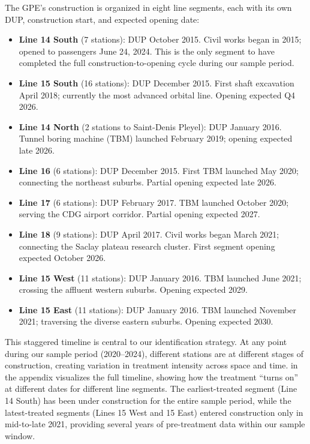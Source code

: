 \documentclass[12pt]{article}
\begin{document}
The GPE's construction is organized in eight line segments, each with its own DUP, construction start, and expected opening date:

\begin{itemize}
\item \textbf{Line 14 South} (7 stations): DUP October 2015. Civil works began in 2015; opened to passengers June 24, 2024. This is the only segment to have completed the full construction-to-opening cycle during our sample period.
\item \textbf{Line 15 South} (16 stations): DUP December 2015. First shaft excavation April 2018; currently the most advanced orbital line. Opening expected Q4 2026.
\item \textbf{Line 14 North} (2 stations to Saint-Denis Pleyel): DUP January 2016. Tunnel boring machine (TBM) launched February 2019; opening expected late 2026.
\item \textbf{Line 16} (6 stations): DUP December 2015. First TBM launched May 2020; connecting the northeast suburbs. Partial opening expected late 2026.
\item \textbf{Line 17} (6 stations): DUP February 2017. TBM launched October 2020; serving the CDG airport corridor. Partial opening expected 2027.
\item \textbf{Line 18} (9 stations): DUP April 2017. Civil works began March 2021; connecting the Saclay plateau research cluster. First segment opening expected October 2026.
\item \textbf{Line 15 West} (11 stations): DUP January 2016. TBM launched June 2021; crossing the affluent western suburbs. Opening expected 2029.
\item \textbf{Line 15 East} (11 stations): DUP January 2016. TBM launched November 2021; traversing the diverse eastern suburbs. Opening expected 2030.
\end{itemize}

This staggered timeline is central to our identification strategy. At any point during our sample period (2020--2024), different stations are at different stages of construction, creating variation in treatment intensity across space and time.  in the appendix visualizes the full timeline, showing how the treatment ``turns on'' at different dates for different line segments. The earliest-treated segment (Line 14 South) has been under construction for the entire sample period, while the latest-treated segments (Lines 15 West and 15 East) entered construction only in mid-to-late 2021, providing several years of pre-treatment data within our sample window.
\end{document}
